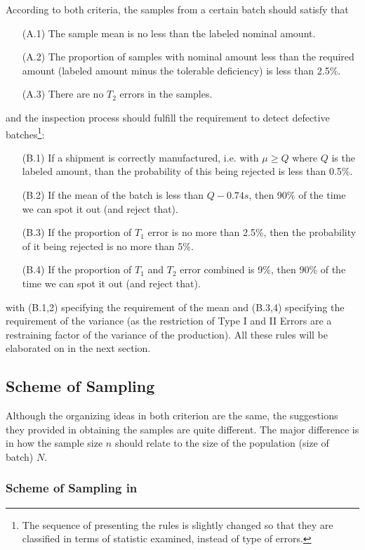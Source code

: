 \documentclass[12pt]{article}
\begin{document}
According to both criteria, the samples from a certain batch should satisfy that
\begin{enumerate}
    \item[(A.1)] The sample mean is no less than the labeled nominal amount.
    \item[(A.2)] The proportion of samples with nominal amount less than the required amount (labeled amount minus the tolerable deficiency) is less than 2.5\%.
    \item[(A.3)] There are no $T_2$ errors in the samples. 
\end{enumerate}
and the inspection process should fulfill the requirement to detect defective batches\footnote{The sequence of presenting the rules is slightly changed so that they are classified in terms of statistic examined, instead of type of errors.}:
\begin{enumerate}
    \item[(B.1)] If a shipment is correctly manufactured, i.e. with $\mu\geq Q$ where $Q$ is the labeled amount, than the probability of this being rejected is less than 0.5\%.
    \item[(B.2)] If the mean of the batch is less than $Q-0.74s$, then 90\% of the time we can spot it out (and reject that).
    \item[(B.3)] If the proportion of $T_1$ error is no more than 2.5\%, then the probability of it being rejected is no more than 5\%.
    \item[(B.4)] If the proportion of $T_1$ and $T_2$ error combined is 9\%, then 90\% of the time we can spot it out (and reject that).
\end{enumerate}
with (B.1,2) specifying the requirement of the mean and (B.3,4) specifying the requirement of the variance (as the restriction of Type I and II Errors are a restraining factor of the variance of the production). All these rules will be elaborated on in the next section.

\subsection{Scheme of Sampling}

Although the organizing ideas in both criterion are the same, the suggestions they provided in obtaining the samples are quite different. The major difference is in how the sample size $n$ should relate to the size of the population (size of batch) $N$. 

\subsubsection{Scheme of Sampling in \cite{JJF2005}}
\end{document}
